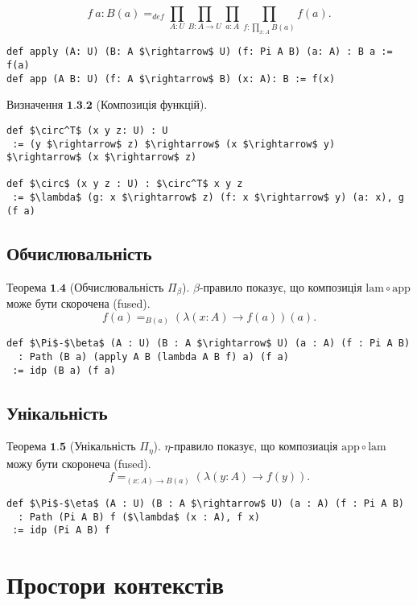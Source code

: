 \documentclass{article}
\theoremstyle{definition}
\begin{document}
$$
    f\ a : B(a) =_{def} \prod_{A:U}\prod_{B: A \rightarrow U}\prod_{a:A}\prod_{f: \prod_{x:A}B(a)}f(a).
$$

\begin{lstlisting}[mathescape=true]
def apply (A: U) (B: A $\rightarrow$ U) (f: Pi A B) (a: A) : B a := f(a)
def app (A B: U) (f: A $\rightarrow$ B) (x: A): B := f(x)
\end{lstlisting}

\noindent $\textbf{Визначення\ 1.3.2}$ (Композиція функцій).
\begin{lstlisting}[mathescape=true]
def $\circ^T$ (x y z: U) : U
 := (y $\rightarrow$ z) $\rightarrow$ (x $\rightarrow$ y) $\rightarrow$ (x $\rightarrow$ z)

def $\circ$ (x y z : U) : $\circ^T$ x y z
 := $\lambda$ (g: x $\rightarrow$ z) (f: x $\rightarrow$ y) (a: x), g (f a)
\end{lstlisting}

\subsection{Обчислювальність}

$\textbf{Теорема\ 1.4}$ (Обчислювальність $\Pi_\beta$).
$\beta$-правило показує, що композиція $\mathrm{lam} \circ \mathrm{app}$ може бути скорочена (fused).
$$
    f(a) =_{B(a)} (\lambda (x:A) \rightarrow f(a))(a).
$$
\begin{lstlisting}[mathescape=true]
def $\Pi$-$\beta$ (A : U) (B : A $\rightarrow$ U) (a : A) (f : Pi A B)
  : Path (B a) (apply A B (lambda A B f) a) (f a)
 := idp (B a) (f a)
\end{lstlisting}

\subsection{Унікальність}

$\textbf{Теорема\ 1.5}$ (Унікальність $\Pi_\eta$).
$\eta$-правило показує, що композиація $\mathrm{app} \circ \mathrm{lam}$ можу бути скоронеча (fused).
$$
    f =_{(x:A)\rightarrow B(a)} (\lambda (y:A) \rightarrow f(y)).
$$
\begin{lstlisting}[mathescape=true]
def $\Pi$-$\eta$ (A : U) (B : A $\rightarrow$ U) (a : A) (f : Pi A B)
  : Path (Pi A B) f ($\lambda$ (x : A), f x)
 := idp (Pi A B) f
\end{lstlisting}

\newpage
\section{Простори контекстів}
\end{document}
